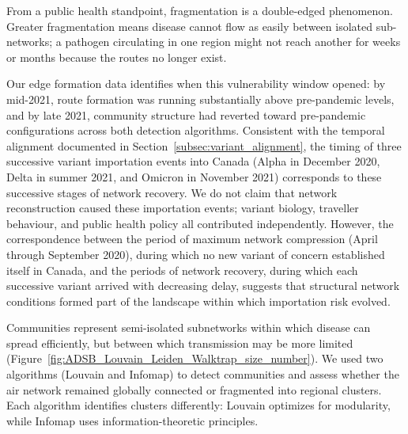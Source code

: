 \documentclass{elsarticle}
\begin{document}
From a public health standpoint, fragmentation is a double-edged phenomenon. Greater fragmentation means disease cannot flow as easily between isolated sub-networks; a pathogen circulating in one region might not reach another for weeks or months because the routes no longer exist.

Our edge formation data identifies when this vulnerability window opened: by mid-2021, route formation was running substantially above pre-pandemic levels, and by late 2021, community structure had reverted toward pre-pandemic configurations across both detection algorithms. Consistent with the temporal alignment documented in Section~\ref{subsec:variant_alignment}, the timing of three successive variant importation events into Canada (Alpha in December 2020, Delta in summer 2021, and Omicron in November 2021) corresponds to these successive stages of network recovery. We do not claim that network reconstruction caused these importation events; variant biology, traveller behaviour, and public health policy all contributed independently. However, the correspondence between the period of maximum network compression (April through September 2020), during which no new variant of concern established itself in Canada, and the periods of network recovery, during which each successive variant arrived with decreasing delay, suggests that structural network conditions formed part of the landscape within which importation risk evolved.

Communities represent semi-isolated subnetworks within which disease can spread efficiently, but between which transmission may be more limited (Figure~\ref{fig:ADSB_Louvain_Leiden_Walktrap_size_number}). We used two algorithms (Louvain and Infomap) to detect communities and assess whether the air network remained globally connected or fragmented into regional clusters. Each algorithm identifies clusters differently: Louvain optimizes for modularity, while Infomap uses information-theoretic principles.
\end{document}
